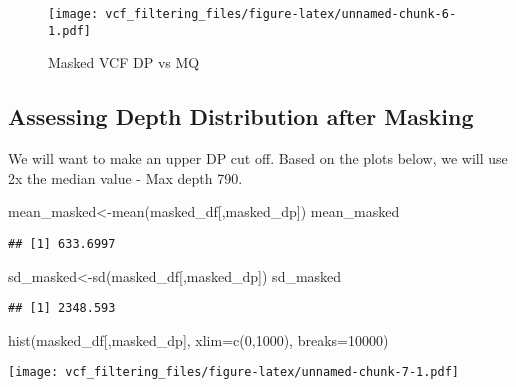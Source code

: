 \documentclass[
]{article}
\newenvironment{Shaded}{\begin{snugshade}}{\end{snugshade}}
\newcommand{\AttributeTok}[1]{\textcolor[rgb]{0.77,0.63,0.00}{#1}}
\newcommand{\DecValTok}[1]{\textcolor[rgb]{0.00,0.00,0.81}{#1}}
\newcommand{\FunctionTok}[1]{\textcolor[rgb]{0.00,0.00,0.00}{#1}}
\newcommand{\NormalTok}[1]{#1}
\newcommand{\OtherTok}[1]{\textcolor[rgb]{0.56,0.35,0.01}{#1}}
\newcommand{\StringTok}[1]{\textcolor[rgb]{0.31,0.60,0.02}{#1}}
\begin{document}
\begin{figure}
\centering
\texttt{[image: vcf\_filtering\_files/figure-latex/unnamed-chunk-6-1.pdf]}
\caption{Masked VCF DP vs MQ}
\end{figure}

\hypertarget{assessing-depth-distribution-after-masking}{%
\subsection{Assessing Depth Distribution after
Masking}\label{assessing-depth-distribution-after-masking}}

We will want to make an upper DP cut off. Based on the plots below, we
will use 2x the median value - Max depth 790.

\begin{Shaded}
\begin{Highlighting}[]
\NormalTok{mean\_masked}\OtherTok{\textless{}{-}}\FunctionTok{mean}\NormalTok{(masked\_df[,}\StringTok{\textquotesingle{}masked\_dp\textquotesingle{}}\NormalTok{])}
\NormalTok{mean\_masked}
\end{Highlighting}
\end{Shaded}

\begin{verbatim}
## [1] 633.6997
\end{verbatim}

\begin{Shaded}
\begin{Highlighting}[]
\NormalTok{sd\_masked}\OtherTok{\textless{}{-}}\FunctionTok{sd}\NormalTok{(masked\_df[,}\StringTok{\textquotesingle{}masked\_dp\textquotesingle{}}\NormalTok{])}
\NormalTok{sd\_masked}
\end{Highlighting}
\end{Shaded}

\begin{verbatim}
## [1] 2348.593
\end{verbatim}

\begin{Shaded}
\begin{Highlighting}[]
\FunctionTok{hist}\NormalTok{(masked\_df[,}\StringTok{\textquotesingle{}masked\_dp\textquotesingle{}}\NormalTok{], }\AttributeTok{xlim=}\FunctionTok{c}\NormalTok{(}\DecValTok{0}\NormalTok{,}\DecValTok{1000}\NormalTok{), }\AttributeTok{breaks=}\DecValTok{10000}\NormalTok{)}
\end{Highlighting}
\end{Shaded}

\texttt{[image: vcf\_filtering\_files/figure-latex/unnamed-chunk-7-1.pdf]}
\end{document}
